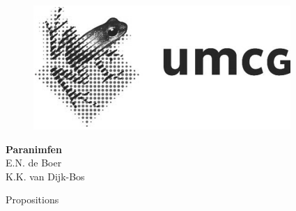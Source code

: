 \begin{figure}[!htbp]
	\centering
	
	\begin{minipage}[b]{0.24\textwidth}
		\includegraphics[width=\textwidth]{img/colofon_umcg_zw}
	\end{minipage}
	\hfill
	\begin{minipage}[b]{0.29\textwidth}
	\end{minipage}
	
\end{figure}

\clearpage



\clearpage

\noindent
\textbf{Paranimfen}\\
E.N. de Boer\\
K.K. van Dijk-Bos\\

\clearpage

\noindent
	\Large
Propositions

\small

